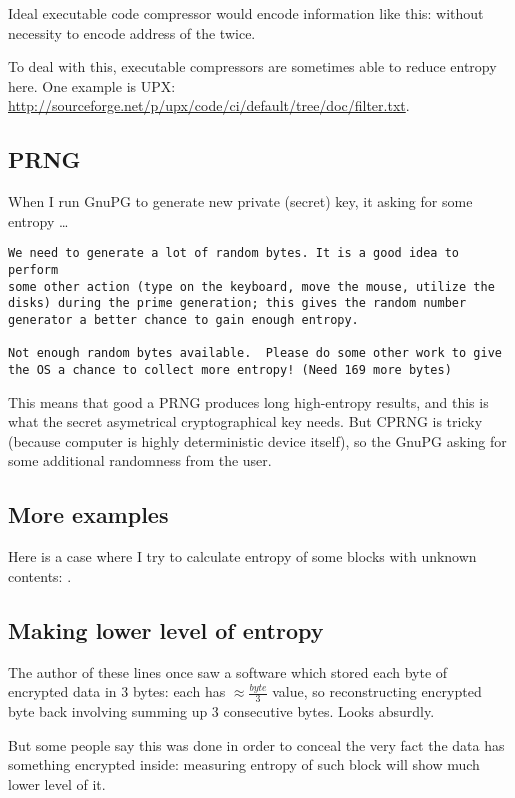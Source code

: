 Ideal executable code compressor would encode information like this:
 without necessity to encode
address of the  twice.

To deal with this, executable compressors are sometimes able to reduce entropy here.
One example is UPX: \url{http://sourceforge.net/p/upx/code/ci/default/tree/doc/filter.txt}.

\subsection{\ac{PRNG}}

When I run GnuPG to generate new private (secret) key, it asking for some entropy \dots

\begin{lstlisting}
We need to generate a lot of random bytes. It is a good idea to perform
some other action (type on the keyboard, move the mouse, utilize the
disks) during the prime generation; this gives the random number
generator a better chance to gain enough entropy.

Not enough random bytes available.  Please do some other work to give
the OS a chance to collect more entropy! (Need 169 more bytes)
\end{lstlisting}

This means that good a \ac{PRNG} produces long high-entropy results,
and this is what the secret asymetrical cryptographical key needs.
But \ac{CPRNG} is tricky (because computer is highly deterministic device itself),
so the GnuPG asking for some additional randomness from the user.

\subsection{More examples}

Here is a case where I try to calculate entropy of some blocks with unknown contents: .



\subsection{Making lower level of entropy}

The author of these lines once saw a software which stored each byte of encrypted data in 3 bytes:
each has {\Large $\approx \frac{byte}{3}$} value, so reconstructing encrypted byte back involving summing up 3 consecutive bytes.
Looks absurdly.

But some people say this was done in order to conceal the very fact
the data has something encrypted inside: measuring entropy of such block will show much lower level of it.

